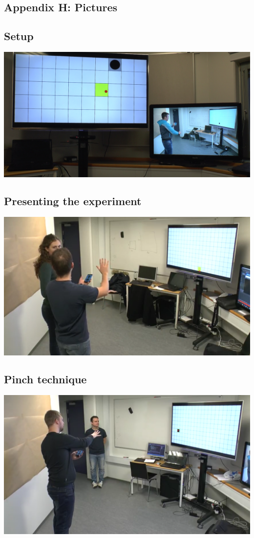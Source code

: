 \subsection*{Appendix H: Pictures}

\subsection*{Setup}
\includegraphics[width=\textwidth]{appendix/images/setup.jpg}

\subsection*{Presenting the experiment}
\includegraphics[width=\textwidth]{appendix/images/alina_presenting.png}

\subsection*{Pinch technique}
\includegraphics[width=\textwidth]{appendix/images/alex_pinching.png}

